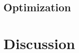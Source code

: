         
        \subsection{Optimization}                   \label{Chapter:RSM/LTFM/Optimization}
    
    
    
    \section{Discussion}                            \label{Chapter:RSM/discussion}
    

